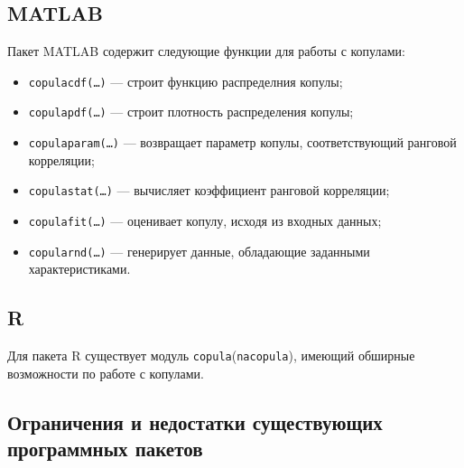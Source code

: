 \subsection*{MATLAB}
Пакет MATLAB содержит следующие функции для работы с копулами:
\begin{itemize}
	\item \texttt{copulacdf(\ldots)} --- строит функцию распределния копулы;
	\item \texttt{copulapdf(\ldots)} --- строит плотность распределения копулы;
	\item \texttt{copulaparam(\ldots)} --- возвращает параметр копулы, соответствующий ранговой корреляции;
	\item \texttt{copulastat(\ldots)} --- вычисляет коэффициент ранговой корреляции;
	\item \texttt{copulafit(\ldots)} --- оценивает копулу, исходя из входных данных;
	\item \texttt{copularnd(\ldots)} --- генерирует данные, обладающие заданными характеристиками.
\end{itemize}

\subsection*{R}
Для пакета R существует модуль \texttt{copula}(\texttt{nacopula}), имеющий обширные возможности \cite{Rcopula} по работе с копулами.

\subsection*{Ограничения и недостатки существующих программных пакетов}

\clearpage
